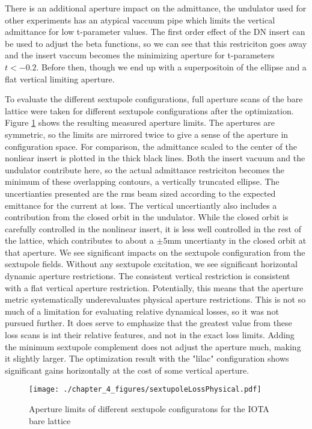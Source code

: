 There is an additional aperture impact on the admittance, the undulator used for other experiments has an atypical vaccuum pipe which limits the vertical admittance for low t-parameter values. The first order effect of the DN insert can be used to adjust the beta functions, so we can see that this restriciton goes away and the insert vaccum becomes the minimizing aperture for t-parameters $t<-0.2$. Before then, though we end up with a superpositoin of the ellipse and a flat vertical limiting aperture.


To evaluate the different sextupole configurations, full aperture scans of the bare lattice were taken for different sextupole configurations after the optimization. Figure \ref{fig:bareDA} shows the resulting measured aperture limits. The apertures are symmetric, so the limits are mirrored twice to give a sense of the aperture in configuration space. For comparison, the admittance scaled to the center of the nonliear insert is plotted in the thick black lines. Both the insert vacuum and the undulator contribute here, so the actual admittance restriciton becomes the minimum of these overlapping contours, a vertically truncated ellipse. The uncertianties presented are the rms beam sized according to the expected emittance for the current at loss. The vertical uncertiantly also includes a contribution from the closed orbit in the undulator. While the closed orbit is carefully controlled in the nonlinear insert, it is less well controlled in the rest of the lattice, which contributes to about a $\pm 5$mm uncertianty in the closed orbit at that aperture. We see significant impacts on the sextupole configuration from the sextupole fields. Without any sextupole excitation, we see significant horizontal dynamic aperture restrictions. The consistent vertical restriction is consistent with a flat vertical aperture restriction. Potentially, this means that the aperture metric systematically underevaluates physical aperture restrictions. This is not so much of a limitation for evaluating relative dynamical losses, so it was not pursued further. It does serve to emphasize that the greatest value from these loss scans is int their relative features, and not in the exact loss limits. Adding the minimum sextupole complement does not adjust the aperture much, making it slightly larger. The optimization result with the "lilac" configuration shows significant gains horizontally at the cost of some vertical aperture.

\begin{figure}
	\centering
	\texttt{[image: ./chapter\_4\_figures/sextupoleLossPhysical.pdf]}
	\caption{Aperture limits of different sextupole configuratons for the IOTA bare lattice}
	\label{fig:bareDA}
\end{figure}

